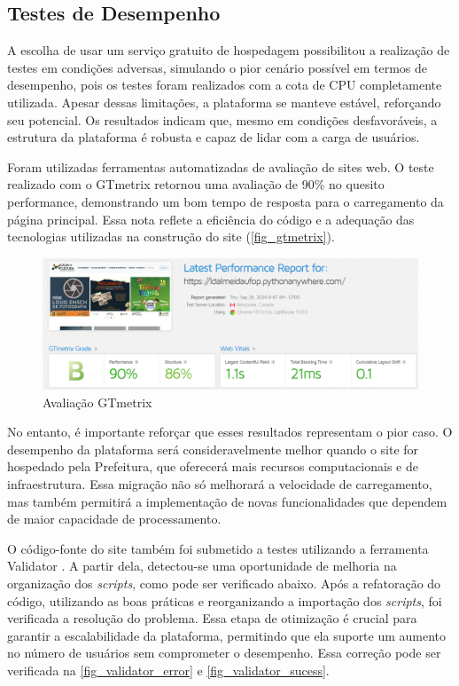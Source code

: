\subsection{Testes de Desempenho}

A escolha de usar um serviço gratuito de hospedagem possibilitou a realização de testes em condições adversas, simulando o pior cenário possível em termos de desempenho, pois os testes foram realizados com a cota de CPU completamente utilizada. Apesar dessas limitações, a plataforma se manteve estável, reforçando seu potencial. Os resultados indicam que, mesmo em condições desfavoráveis, a estrutura da plataforma é robusta e capaz de lidar com a carga de usuários.

Foram utilizadas ferramentas automatizadas de avaliação de sites web. O teste realizado com o GTmetrix \cite{GTMetrix} retornou uma avaliação de 90\% no quesito performance, demonstrando um bom tempo de resposta para o carregamento da página principal. Essa nota reflete a eficiência do código e a adequação das tecnologias utilizadas na construção do site (\autoref{fig_gtmetrix}).

\begin{figure}[htb] \caption{\label{fig_gtmetrix}Avaliação GTmetrix} \begin{center} \includegraphics[scale=0.35]{./img/gtmetrix.png} \end{center}  \end{figure}

No entanto, é importante reforçar que esses resultados representam o pior caso. O desempenho da plataforma será consideravelmente melhor quando o site for hospedado pela Prefeitura, que oferecerá mais recursos computacionais e de infraestrutura. Essa migração não só melhorará a velocidade de carregamento, mas também permitirá a implementação de novas funcionalidades que dependem de maior capacidade de processamento.

O código-fonte do site também foi submetido a testes utilizando a ferramenta Validator \cite{Validator}. A partir dela, detectou-se uma oportunidade de melhoria na organização dos \textit{scripts}, como pode ser verificado abaixo. Após a refatoração do código, utilizando as boas práticas e reorganizando a importação dos \textit{scripts}, foi verificada a resolução do problema. Essa etapa de otimização é crucial para garantir a escalabilidade da plataforma, permitindo que ela suporte um aumento no número de usuários sem comprometer o desempenho. Essa correção pode ser verificada na \autoref{fig_validator_error} e \autoref{fig_validator_sucess}.


